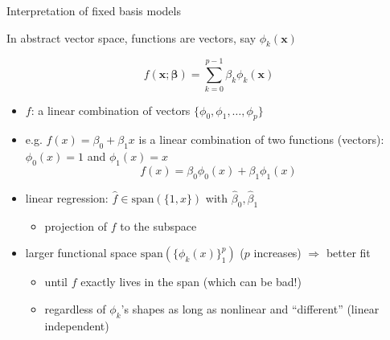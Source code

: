 \documentclass[ignorenonframetext,aspectratio=169]{beamer}
\providecommand{\tightlist}{%
  \setlength{\itemsep}{0pt}\setlength{\parskip}{0pt}}
\newcommand{\vv}[1]{\boldsymbol{#1}}
\begin{document}
\begin{frame}{Interpretation of fixed basis models}
\protect\hypertarget{interpretation-of-fixed-basis-models}{}

In abstract vector space, functions are vectors, say \(\phi_k(\vv{x})\)

\[f(\vv{x};\vv{\beta})= \sum_{k=0}^{p-1} {\beta}_k {\phi}_k(\vv{x})\]

\begin{itemize}
\tightlist
\item
  \(f\): a linear combination of vectors
  \(\{\phi_0,\phi_1,\ldots,\phi_p\}\)
\item
  e.g. \(f(x) = \beta_0 +\beta_1x\) is a linear combination of two
  functions (vectors): \(\phi_0(x)= 1\) and \(\phi_1(x) =x\)
  \[f(x) = \beta_0 \phi_0(x)+\beta_1\phi_1(x)\]
\item
  linear regression: \(\hat{f}\in \text{span}(\{1, x\})\) with
  \(\hat{\beta}_0, \hat{\beta}_1\)

  \begin{itemize}
  \tightlist
  \item
    projection of \(f\) to the subspace
  \end{itemize}
\item
  larger functional space \(\text{span}(\{\phi_k(x)\}_1^p)\) (\(p\)
  increases) \(\Rightarrow\) better fit

  \begin{itemize}
  \tightlist
  \item
    until \(f\) exactly lives in the span (which can be bad!)
  \item
    regardless of \(\phi_k\)'s shapes as long as nonlinear and
    ``different'' (linear independent)
  \end{itemize}
\end{itemize}

\end{frame}
\end{document}

